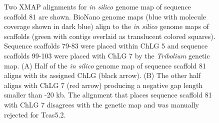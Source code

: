 \documentclass{bmcart}
\begin{document}
\begin{backmatter}
\begin{figure}[h!]
	\caption{
		Two XMAP alignments for \textit{in silico} genome map of sequence scaffold 81 are shown. BioNano genome maps (blue with molecule coverage shown in dark blue) align to the \textit{in silico} genome maps of scaffolds (green with contigs overlaid as translucent colored squares). Sequence scaffolds 79-83 were placed within ChLG 5 and sequence scaffolds 99-103 were placed with ChLG 7 by the \textit{Tribolium} genetic map. (A) Half of the \textit{in silico} genome map of sequence scaffold 81 aligns with its assigned ChLG (black arrow). (B) The other half aligns with ChLG 7 (red arrow) producing a negative gap length smaller than -20 kb. The alignment that places sequence scaffold 81 with ChLG 7 disagrees with the genetic map and was manually rejected for Tcas5.2.}
      \end{figure}            





\end{backmatter}
\end{document}
